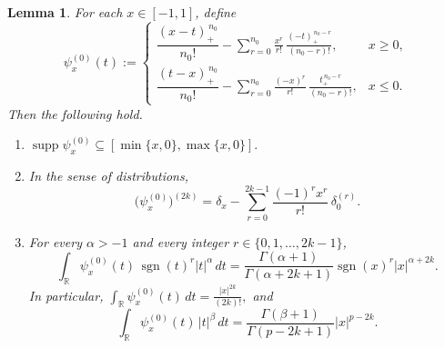 \documentclass[10pt,a4paper]{amsart}
\newtheorem{lemma}{Lemma}
\begin{document}
\begin{lemma}\label{lem:zero-anchored-primitive-log}
For each $x\in[-1,1]$, define
\[
\psi_x^{(0)}(t):=
\begin{cases}
\dfrac{(x-t)_+^{\,n_0}}{n_0!}
-
\displaystyle\sum_{r=0}^{n_0}
\frac{x^r}{r!}\,
\frac{(-t)_+^{\,n_0-r}}{(n_0-r)!},
& x\ge 0,\\[3ex]
\dfrac{(t-x)_+^{\,n_0}}{n_0!}
-
\displaystyle\sum_{r=0}^{n_0}
\frac{(-x)^r}{r!}\,
\frac{t_+^{\,n_0-r}}{(n_0-r)!},
& x\le 0.
\end{cases}
\]
Then the following hold.

\begin{enumerate}
\item[\textnormal{(i)}]
\(
\operatorname{supp}\psi_x^{(0)}
\subseteq [\min\{x,0\},\max\{x,0\}].
\)

\item[\textnormal{(ii)}]
In the sense of distributions,
\[
\bigl(\psi_x^{(0)}\bigr)^{(2k)}
=
\delta_x-\sum_{r=0}^{2k-1}\frac{(-1)^r x^r}{r!}\,\delta_0^{(r)}.
\]

\item[\textnormal{(iii)}]
For every $\alpha>-1$ and every integer $r\in\{0,1,\dots,2k-1\}$,
\[
\int_{\mathbb R}\psi_x^{(0)}(t)\,\operatorname{sgn}(t)^r|t|^\alpha\,dt
=
\frac{\Gamma(\alpha+1)}{\Gamma(\alpha+2k+1)}
\operatorname{sgn}(x)^r|x|^{\alpha+2k}.
\]
In particular,
\(
\int_{\mathbb R}\psi_x^{(0)}(t)\,dt=\frac{|x|^{2k}}{(2k)!},
\)
and
\[
\int_{\mathbb R}\psi_x^{(0)}(t)\,|t|^\beta\,dt
=
\frac{\Gamma(\beta+1)}{\Gamma(p-2k+1)}|x|^{p-2k}.
\]
\end{enumerate}
\end{lemma}
\end{document}
